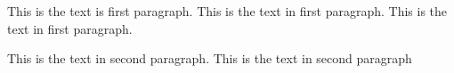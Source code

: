 \documentclass{article}
\begin{document}
     \setlength{\parindent}{10ex}This is the text is first paragraph. This is the text in first paragraph. This is the text in first paragraph. \par \noindent %
      This is the text in second paragraph. This is the text in second paragraph
\end{document}
